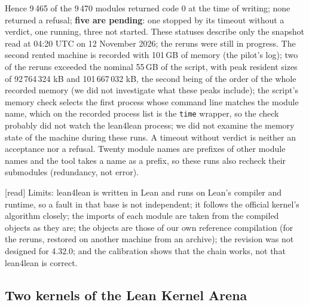 \documentclass[11pt,a4paper]{article}
\theoremstyle{plain}
\theoremstyle{definition}
\theoremstyle{remark}
\numberwithin{equation}{section}
\newcommand{\st}[1]{\textsf{[#1]}}
\begin{document}
Hence 9\,465 of the 9\,470 modules returned code 0 at the time of writing; none returned a refusal; \textbf{five are pending}: one stopped by its timeout without a verdict, one running, three not started. These statuses describe only the snapshot read at 04:20 UTC on 12 November 2026; the reruns were still in progress.
The second rented machine is recorded with 101\,GB of memory (the pilot's log); two of the reruns exceeded the nominal 55\,GB of the script, with peak resident sizes of 92\,764\,324 kB and 101\,667\,032 kB, the second being of the order of the whole recorded memory (we did not investigate what these peaks include); the script's memory check selects the first process whose command line matches the module name, which on the recorded process list is the \texttt{time} wrapper, so the check probably did not watch the lean4lean process; we did not examine the memory state of the machine during these runs. A timeout without verdict is neither an acceptance nor a refusal.
Twenty module names are prefixes of other module names and the tool takes a name as a prefix, so these runs also recheck their
submodules (redundancy, not error).

\st{read} Limits: lean4lean is written in Lean and runs on Lean's compiler and runtime, so a fault in that base is not independent;
it follows the official kernel's algorithm closely; the imports of each module are taken from the compiled objects as they are;
the objects are those of our own reference compilation (for the reruns, restored on another machine from an archive); the revision was not designed for 4.32.0; and the calibration shows that
the chain works, not that lean4lean is correct.

\subsection{Two kernels of the Lean Kernel Arena}\label{sec:arena}
\end{document}
